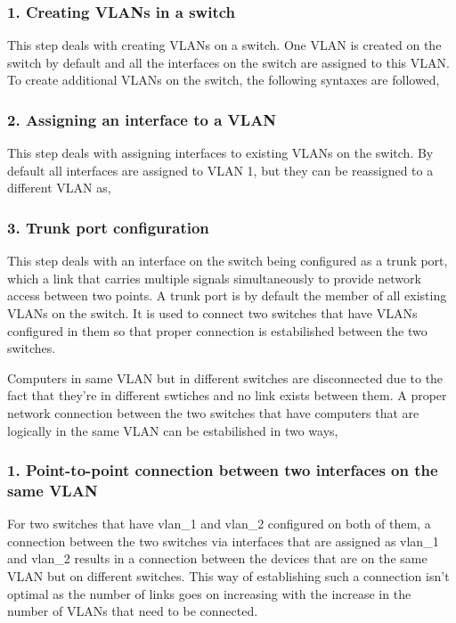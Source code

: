 \documentclass{lab_sheet}
\newcommand{\syntax}[2]{
    
}
\begin{document}
\subsubsection*{1. Creating VLANs in a switch}
This step deals with creating VLANs on a switch. One VLAN is created on the switch by default and all the interfaces on the switch are assigned to this VLAN. To create additional VLANs on the switch, the following syntaxes are followed,
\syntax{config}{creating VLANs}
\subsubsection*{2. Assigning an interface to a VLAN}
This step deals with assigning interfaces to existing VLANs on the switch. By default all interfaces are assigned to VLAN 1, but they can be reassigned to a different VLAN as,
\syntax{assign}{assigning an interface to a particular VLAN}
\subsubsection*{3. Trunk port configuration}
This step deals with an interface on the switch being configured as a trunk port, which a link that carries multiple signals simultaneously to provide network access between two points. A trunk port is by default the member of all existing VLANs on the switch. It is used to connect two switches that have VLANs configured in them so that proper connection is estabilished between the two switches. 
\syntax{trunk}{configuring an interface as trunk port}
\syntax{manipulation}{manipulating VLANs in trunk port}
Computers in same VLAN but in different switches are disconnected due to the fact that they're in different swtiches and no link exists between them. A proper network connection between the two switches that have computers that are logically in the same VLAN can be estabilished in two ways,
\subsubsection*{1. Point-to-point connection between two interfaces on the same VLAN}
For two switches that have vlan\_1 and vlan\_2 configured on both of them, a connection between the two switches via interfaces that are assigned as vlan\_1 and vlan\_2 results in a connection between the devices that are on the same VLAN but on different switches. This way of establishing such a connection isn't optimal as the number of links goes on increasing with the increase in the number of VLANs that need to be connected.
\end{document}
